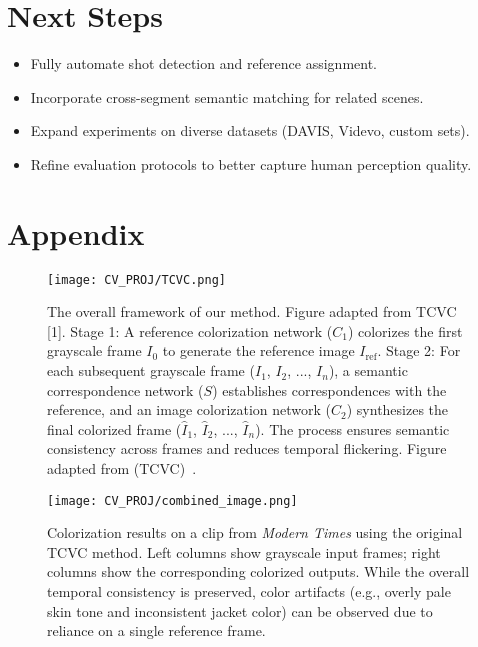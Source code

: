 \documentclass[10pt,twocolumn,letterpaper]{article}
\begin{document}
\section{Next Steps}
\begin{itemize}
    \item Fully automate shot detection and reference assignment.
    \item Incorporate cross-segment semantic matching for related scenes.
    \item Expand experiments on diverse datasets (DAVIS, Videvo, custom sets).
    \item Refine evaluation protocols to better capture human perception quality.
\end{itemize}




\clearpage
\appendix
\section*{Appendix}

\begin{figure*}[ht]
    \centering
    \texttt{[image: CV\_PROJ/TCVC.png]}
    \caption{The overall framework of our method. Figure adapted from TCVC [1].  Stage 1: A reference colorization network ($C_1$) colorizes the first grayscale frame $I_0$ to generate the reference image $I_{\text{ref}}$. Stage 2: For each subsequent grayscale frame ($I_1$, $I_2$, ..., $I_n$), a semantic correspondence network ($S$) establishes correspondences with the reference, and an image colorization network ($C_2$) synthesizes the final colorized frame ($\hat{I}_1$, $\hat{I}_2$, ..., $\hat{I}_n$). The process ensures semantic consistency across frames and reduces temporal flickering. Figure adapted from{ (TCVC)}~\cite{zhang2023temporal}.}
    \label{fig:tcvc_overall}
\end{figure*}



\clearpage


\begin{figure}[ht]
    \centering
    \texttt{[image: CV\_PROJ/combined\_image.png]}
    \caption{Colorization results on a clip from \textit{Modern Times} using the original TCVC method. Left columns show grayscale input frames; right columns show the corresponding colorized outputs. While the overall temporal consistency is preserved, color artifacts (e.g., overly pale skin tone and inconsistent jacket color) can be observed due to reliance on a single reference frame.}

    \label{fig:combined_image}
\end{figure}
\end{document}
